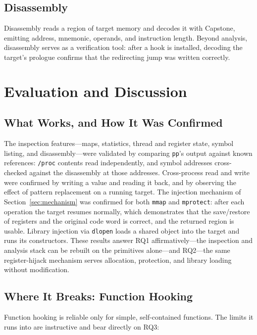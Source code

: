 \documentclass[10pt,twocolumn,a4paper]{article}
\begin{document}
\subsection{Disassembly}
Disassembly reads a region of target memory and decodes it with Capstone,
emitting address, mnemonic, operands, and instruction length. Beyond analysis,
disassembly serves as a verification tool: after a hook is installed, decoding the
target's prologue confirms that the redirecting jump was written correctly.

\section{Evaluation and Discussion}\label{sec:eval}

\subsection{What Works, and How It Was Confirmed}
The inspection features---maps, statistics, thread and register state, symbol
listing, and disassembly---were validated by comparing \texttt{pp}'s output
against known references: \texttt{/proc} contents read independently, and symbol
addresses cross-checked against the disassembly at those addresses. Cross-process
read and write were confirmed by writing a value and reading it back, and by
observing the effect of pattern replacement on a running target. The injection
mechanism of Section~\ref{sec:mechanism} was confirmed for both \texttt{mmap} and
\texttt{mprotect}: after each operation the target resumes normally, which
demonstrates that the save/restore of registers and the original code word is
correct, and the returned region is usable. Library injection via \texttt{dlopen}
loads a shared object into the target and runs its constructors. These results
answer RQ1 affirmatively---the inspection and analysis stack can be rebuilt on the
primitives alone---and RQ2---the same register-hijack mechanism serves allocation,
protection, and library loading without modification.

\subsection{Where It Breaks: Function Hooking}
Function hooking is reliable only for simple, self-contained functions. The
limits it runs into are instructive and bear directly on RQ3:
\end{document}
